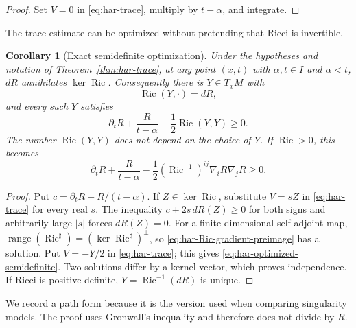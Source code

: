 \documentclass[10pt]{coll-l}
\newtheorem{corollary}[theorem]{Corollary}
\theoremstyle{definition}
\theoremstyle{remark}
\numberwithin{section}{chapter}
\numberwithin{equation}{chapter}
\newcommand{\Ric}{\operatorname{Ric}}
\begin{document}
\begin{proof}
Set $V=0$ in \eqref{eq:har-trace}, multiply by $t-\alpha$, and integrate.
\end{proof}

The trace estimate can be optimized without pretending that Ricci is
invertible.

\begin{corollary}[Exact semidefinite optimization]
\label{cor:har-semidefinite-optimization}
Under the hypotheses and notation of Theorem~\ref{thm:har-trace}, at any
point $(x,t)$ with $\alpha,t\in I$ and $\alpha<t$, $dR$ annihilates
$\ker\Ric$.  Consequently
there is
$Y\in T_xM$ with
\begin{equation}
                         \Ric(Y,\cdot)=dR,               \label{eq:har-Ric-gradient-preimage}
\end{equation}
and every such $Y$ satisfies
\begin{equation}
 \partial_tR+\frac R{t-\alpha}-\frac12\Ric(Y,Y)\geq0.   \label{eq:har-optimized-semidefinite}
\end{equation}
The number $\Ric(Y,Y)$ does not depend on the choice of $Y$.  If
$\Ric>0$, this becomes
\begin{equation}
 \partial_tR+\frac R{t-\alpha}
 -\frac12(\Ric^{-1})^{ij}\nabla_iR\nabla_jR\geq0.      \label{eq:har-optimized-positive}
\end{equation}
\end{corollary}

\begin{proof}
Put $c=\partial_tR+R/(t-\alpha)$.  If $Z\in\ker\Ric$, substitute $V=sZ$
in \eqref{eq:har-trace} for every real $s$.  The inequality
$c+2s\,dR(Z)\geq0$ for both signs and arbitrarily large $|s|$ forces
$dR(Z)=0$.  For a finite-dimensional self-adjoint map,
$\operatorname{range}(\Ric^\sharp)=(\ker\Ric^\sharp)^\perp$, so
\eqref{eq:har-Ric-gradient-preimage} has a solution.  Put $V=-Y/2$ in
\eqref{eq:har-trace}; this gives \eqref{eq:har-optimized-semidefinite}.
Two solutions differ by a kernel vector, which proves independence.  If
Ricci is positive definite, $Y=\Ric^{-1}(dR)$ is unique.
\end{proof}

We record a path form because it is the version used when comparing
singularity models.  The proof uses Gronwall's inequality and therefore
does not divide by $R$.
\end{document}
